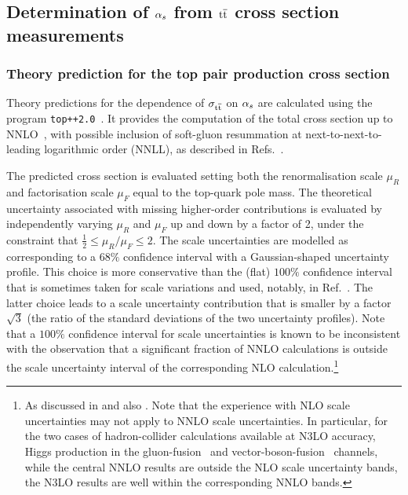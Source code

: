 \subsection{Determination of \texorpdfstring{$\alpha_s$}{alphas} from \texorpdfstring{$\mathrm{t}\overline{\mathrm{t}}$}{tt} cross section measurements}

\subsubsection{Theory prediction for the top pair production cross section}
\label{sec:theory-predictions}

Theory predictions for the dependence of $\sigma_{\mathrm{t}\overline{\mathrm{t}}}$ on $\alpha_s$ are
calculated using the program
\texttt{top++2.0}~\cite{Czakon:2011xx}. 
%
It provides the computation of the total cross section up to
NNLO~\cite{Czakon:2013goa}, with possible inclusion of soft-gluon
resummation at next-to-next-to-leading logarithmic order (NNLL), as
described in Refs.~\cite{Beneke:2009rj,Czakon:2009zw}.

The predicted cross section is evaluated setting both the
renormalisation scale $\mu_R$ and factorisation scale $\mu_F$ equal to
the top-quark pole mass. 
%
The theoretical uncertainty associated with missing higher-order
contributions is evaluated by independently varying $\mu_R$ and $\mu_F$
up and down by a factor of 2, under the constraint that
$\frac{1}{2} \leq \mu_R / \mu_F \leq 2$.
%
The scale uncertainties are modelled as corresponding to a $68\%$
confidence interval with a Gaussian-shaped uncertainty profile.
%
This choice is more conservative than the (flat) $100\%$ confidence
interval that is sometimes taken for scale variations and used,
notably, in Ref.~\cite{Chatrchyan:2013haa}. 
%
The latter choice leads to a scale
uncertainty contribution that is smaller by a factor $\sqrt{3}$ (the
ratio of the standard deviations of the two uncertainty profiles).
%
Note that a $100\%$ confidence
interval for scale uncertainties is known to be inconsistent with the
observation that a significant fraction of NNLO calculations is
outside the scale uncertainty interval of the corresponding NLO
calculation.\footnote{As discussed in \cite{Bagnaschi:2014wea} and
  also \cite{GavinLHCPtalk}. 
  Note that the experience with NLO scale uncertainties may not apply
  to NNLO scale uncertainties.
  In particular, for the two cases of hadron-collider calculations
  available at N3LO accuracy, Higgs production in the
  gluon-fusion~\cite{Anastasiou:2016cez} and
  vector-boson-fusion~\cite{Dreyer:2016oyx} channels, while the
  central NNLO results are outside the NLO scale uncertainty bands, the N3LO
  results are well within the corresponding NNLO bands. }


